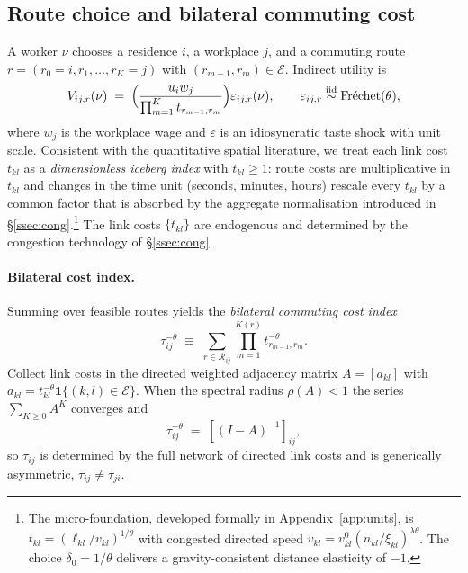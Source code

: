 \documentclass[12pt]{article}
\newcommand{\E}{\mathcal E}
\newcommand{\R}{\mathcal R}
\newcommand{\tkl}{t_{kl}}
\newcommand{\tijk}{\tau_{ij}}
\begin{document}
\subsection{Route choice and bilateral commuting cost}\label{ssec:route}

A worker $\nu$ chooses a residence $i$, a workplace $j$, and a
commuting route $r=(r_0=i,r_1,\dots,r_K=j)$ with $(r_{m-1},r_m)\in\E$.
Indirect utility is
\begin{equation}
  V_{ij,r}(\nu)
  \;=\;
  \Bigl(\frac{u_iw_j}{\prod_{m=1}^{K}t_{r_{m-1},r_{m}}}\Bigr)\varepsilon_{ij,r}(\nu),
  \qquad
  \varepsilon_{ij,r}\overset{\text{iid}}{\sim}\text{Fr\'echet}(\theta),
  \label{eq:utility}
\end{equation}
where $w_j$ is the workplace wage and $\varepsilon$ is an
idiosyncratic taste shock with unit scale.  Consistent with the
quantitative spatial literature, we treat each link cost $\tkl$ as a
\emph{dimensionless iceberg index} with $\tkl\ge 1$: route costs are
multiplicative in $\tkl$ and changes in the time unit (seconds,
minutes, hours) rescale every $\tkl$ by a common factor that is
absorbed by the aggregate normalisation introduced in
\S\ref{ssec:cong}.\footnote{The micro-foundation, developed formally in
Appendix~\ref{app:units}, is $\tkl=(\ell_{kl}/v_{kl})^{1/\theta}$
with congested directed speed
$v_{kl}=v^{0}_{kl}(n_{kl}/\xi_{kl})^{\lambda\theta}$.  The choice
$\delta_0=1/\theta$ delivers a gravity-consistent distance elasticity
of $-1$.}  The link costs $\{\tkl\}$ are endogenous and determined by
the congestion technology of \S\ref{ssec:cong}.

\paragraph{Bilateral cost index.}
Summing over feasible routes yields the \emph{bilateral commuting
cost index}
\begin{equation}
  \tijk^{-\theta}
  \;\equiv\;
  \sum_{r\in\R_{ij}}\prod_{m=1}^{K(r)}t_{r_{m-1},r_{m}}^{-\theta}.
  \label{eq:tau_def}
\end{equation}
Collect link costs in the directed weighted adjacency matrix
$A=[a_{kl}]$ with $a_{kl}=\tkl^{-\theta}\mathbf 1\{(k,l)\in\E\}$.
When the spectral radius $\rho(A)<1$ the series
$\sum_{K\ge 0}A^{K}$ converges and
\begin{equation}
  \tijk^{-\theta}\;=\;[(I-A)^{-1}]_{ij},
  \label{eq:tau_series}
\end{equation}
so $\tijk$ is determined by the full network of directed link costs
and is generically asymmetric, $\tijk\neq\tau_{ji}$.
\end{document}
